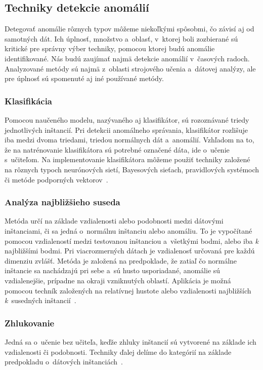 \documentclass[a4paper,twoside,slovak,12pt,appendix]{article}
\begin{document}
\subsection{Techniky detekcie anomálií}
\label{c:analysis-techniques}
Detegovať anomálie rôznych typov môžeme niekoľkými spôsobmi, čo závisí aj od
samotných dát. Ich úplnosť, množstvo a~oblasť, v~ktorej boli zozbierané sú
kritické pre správny výber techniky, pomocou ktorej budú anomálie
identifikované. Nás budú zaujímať najmä detekcie anomálií v~časových radoch.
Analyzované metódy sú najmä z~oblasti strojového učenia a~dátovej analýzy, ale
pre úplnosť sú spomenuté aj iné používané metódy.

\subsubsection{Klasifikácia}
Pomocou naučeného modelu, nazývaného aj klasifikátor, sú rozoznávané triedy
jednotlivých inštancií. Pri detekcii anomálneho správania, klasifikátor
rozlišuje iba medzi dvoma triedami, triedou normálnych dát a~anomálií. Vzhľadom
na to, že na natrénovanie klasifikátora sú potrebné označené dáta, ide o~učenie
s~učiteľom. Na implementovanie klasifikátora môžeme použiť techniky založené na
rôznych typoch neurónových sietí, Bayesových sieťach, pravidlových systémoch či
metóde podporných vektorov~\cite{Chandola2009,Tan2005}.

\subsubsection{Analýza najbližšieho suseda}
Metóda určí na základe vzdialenosti alebo podobnosti medzi dátovými inštanciami,
či sa jedná o~normálnu inštanciu alebo anomáliu. To je vypočítané pomocou
vzdialeností medzi testovanou inštanciou a~všetkými bodmi, alebo iba \textit{k}
najbližšími bodmi. Pri viacrozmerných dátach je vzdialenosť určovaná pre
každú dimenziu zvlášť. Metóda je založená na predpoklade, že zatiaľ čo normálne
inštancie sa nachádzajú pri sebe a~sú husto usporiadané, anomálie sú
vzdialenejšie, prípadne na okraji vzniknutých oblastí. Aplikácia je možná
pomocou techník založených na relatívnej hustote alebo vzdialenosti najbližších
\textit{k}~susedných inštancií~\cite{Tan2005}.

\subsubsection{Zhlukovanie}
\label{c:clustering}
Jedná sa o~učenie bez učiteľa, keďže zhluky inštancií sú vytvorené na základe
ich vzdialenosti či podobnosti. Techniky ďalej delíme do kategórií na základe
predpokladu o~dátových inštanciách~\cite{Tan2005}.
\end{document}
